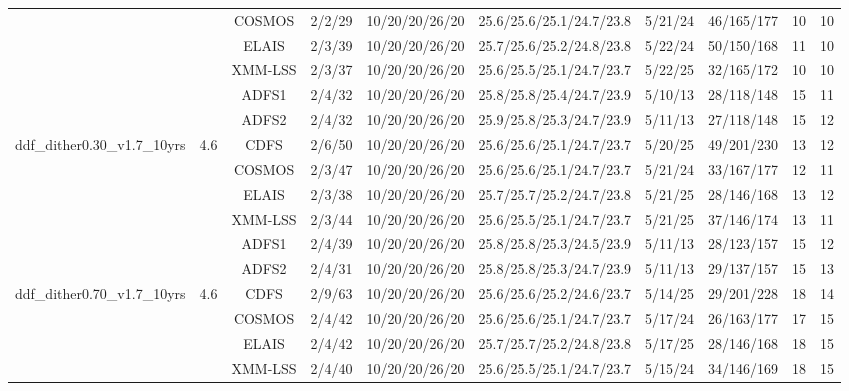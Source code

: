 \begin{center}
\begin{sidewaystable}[htbp]
{\begin{tabular}{c|c|c|c|c|c|c|c|c|c}
& & COSMOS & 2/2/29 & 10/20/20/26/20 & 25.6/25.6/25.1/24.7/23.8 & 5/21/24 & 46/165/177 & 10 & 10 \\ 
& & ELAIS & 2/3/39 & 10/20/20/26/20 & 25.7/25.6/25.2/24.8/23.8 & 5/22/24 & 50/150/168 & 11 & 10 \\ 
& & XMM-LSS & 2/3/37 & 10/20/20/26/20 & 25.6/25.5/25.1/24.7/23.7 & 5/22/25 & 32/165/172 & 10 & 10 \\ 
\hline 
& & ADFS1 & 2/4/32 & 10/20/20/26/20 & 25.8/25.8/25.4/24.7/23.9 & 5/10/13 & 28/118/148 & 15 & 11 \\ 
& & ADFS2 & 2/4/32 & 10/20/20/26/20 & 25.9/25.8/25.3/24.7/23.9 & 5/11/13 & 27/118/148 & 15 & 12 \\ 
ddf\_dither0.30\_v1.7\_10yrs& 4.6& CDFS & 2/6/50 & 10/20/20/26/20 & 25.6/25.6/25.1/24.7/23.7 & 5/20/25 & 49/201/230 & 13 & 12 \\ 
& & COSMOS & 2/3/47 & 10/20/20/26/20 & 25.6/25.6/25.1/24.7/23.7 & 5/21/24 & 33/167/177 & 12 & 11 \\ 
& & ELAIS & 2/3/38 & 10/20/20/26/20 & 25.7/25.7/25.2/24.7/23.8 & 5/21/25 & 28/146/168 & 13 & 12 \\ 
& & XMM-LSS & 2/3/44 & 10/20/20/26/20 & 25.6/25.5/25.1/24.7/23.7 & 5/21/25 & 37/146/174 & 13 & 11 \\ 
\hline 
& & ADFS1 & 2/4/39 & 10/20/20/26/20 & 25.8/25.8/25.3/24.5/23.9 & 5/11/13 & 28/123/157 & 15 & 12 \\ 
& & ADFS2 & 2/4/31 & 10/20/20/26/20 & 25.8/25.8/25.3/24.7/23.9 & 5/11/13 & 29/137/157 & 15 & 13 \\ 
ddf\_dither0.70\_v1.7\_10yrs& 4.6& CDFS & 2/9/63 & 10/20/20/26/20 & 25.6/25.6/25.2/24.6/23.7 & 5/14/25 & 29/201/228 & 18 & 14 \\ 
& & COSMOS & 2/4/42 & 10/20/20/26/20 & 25.6/25.6/25.1/24.7/23.7 & 5/17/24 & 26/163/177 & 17 & 15 \\ 
& & ELAIS & 2/4/42 & 10/20/20/26/20 & 25.7/25.7/25.2/24.8/23.8 & 5/17/25 & 28/146/168 & 18 & 15 \\ 
& & XMM-LSS & 2/4/40 & 10/20/20/26/20 & 25.6/25.5/25.1/24.7/23.7 & 5/15/24 & 34/146/169 & 18 & 15 \\ 
\end{tabular}} 
\end{sidewaystable} 
\end{center}